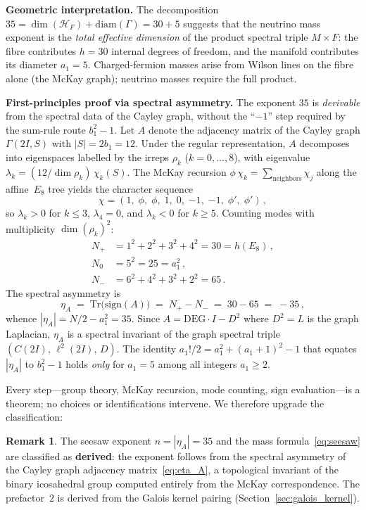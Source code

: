 \documentclass[12pt,a4paper]{article}
\theoremstyle{definition}
\newtheorem{remark}{Remark}
\begin{document}
\textbf{Geometric interpretation.}  The decomposition $35 = \dim(\mathcal{H}_F) + \mathrm{diam}(\Gamma) = 30 + 5$ suggests that the neutrino mass exponent is the \emph{total effective dimension} of the product spectral triple $M \times F$: the fibre contributes $h = 30$ internal degrees of freedom, and the manifold contributes its diameter $a_1 = 5$.  Charged-fermion masses arise from Wilson lines on the fibre alone (the McKay graph); neutrino masses require the full product.

\textbf{First-principles proof via spectral asymmetry.}
The exponent $35$ is \emph{derivable} from the spectral data of the Cayley graph, without the ``$-1$'' step required by the sum-rule route $b_1^2 - 1$.  Let $A$ denote the adjacency matrix of the Cayley graph $\Gamma(2I, S)$ with $|S| = 2b_1 = 12$.  Under the regular representation, $A$ decomposes into eigenspaces labelled by the irreps $\rho_k$ ($k = 0, \ldots, 8$), with eigenvalue $\lambda_k = (12/\dim\rho_k)\,\chi_k(S)$.  The McKay recursion $\phi\,\chi_k = \sum_{\text{neighbors}}\chi_j$ along the affine~$E_8$ tree yields the character sequence
\[
\chi = (1,\;\phi,\;\phi,\;1,\;0,\;{-1},\;{-1},\;\phi',\;\phi')\,,
\]
so $\lambda_k > 0$ for $k \le 3$, $\lambda_4 = 0$, and $\lambda_k < 0$ for $k \ge 5$.  Counting modes with multiplicity $\dim(\rho_k)^2$:
\begin{align}
N_+ &= 1^2 + 2^2 + 3^2 + 4^2 = 30 = h(E_8)\,,\\
N_0 &= 5^2 = 25 = a_1^2\,,\\
N_- &= 6^2 + 4^2 + 3^2 + 2^2 = 65\,.
\end{align}
The spectral asymmetry is
\begin{equation}
\eta_A \;=\; \mathrm{Tr}\bigl(\mathrm{sign}(A)\bigr) \;=\; N_+ - N_- \;=\; 30 - 65 \;=\; -35\,,
\label{eq:eta_A}
\end{equation}
whence $|\eta_A| = N/2 - a_1^2 = 35$.  Since $A = \mathrm{DEG}\cdot I - D^2$ where $D^2 = L$ is the graph Laplacian, $\eta_A$ is a spectral invariant of the graph spectral triple $(C(2I),\,\ell^2(2I),\,D)$.  The identity $a_1!/2 = a_1^2 + (a_1{+}1)^2 - 1$ that equates $|\eta_A|$ to $b_1^2 - 1$ holds \emph{only} for $a_1 = 5$ among all integers $a_1 \ge 2$.

Every step---group theory, McKay recursion, mode counting, sign evaluation---is a theorem; no choices or identifications intervene.  We therefore upgrade the classification:

\begin{remark}
The seesaw exponent $n = |\eta_A| = 35$ and the mass formula~\eqref{eq:seesaw} are classified as \textbf{derived}: the exponent follows from the spectral asymmetry of the Cayley graph adjacency matrix~\eqref{eq:eta_A}, a topological invariant of the binary icosahedral group computed entirely from the McKay correspondence.  The prefactor~$2$ is derived from the Galois kernel pairing (Section~\ref{sec:galois_kernel}).
\end{remark}
\end{document}
